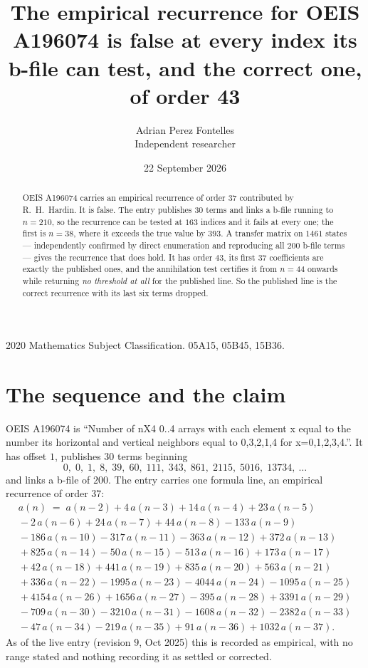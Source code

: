 \documentclass[11pt,a4paper]{article}
\title{The empirical recurrence for OEIS A196074 is false at every index its b-file can
test, and the correct one, of order 43}
\author{Adrian Perez Fontelles\\ \small Independent researcher}
\date{22 September 2026}
\theoremstyle{plain}
\theoremstyle{definition}
\begin{document}
\maketitle

\begin{abstract}
OEIS A196074 carries an empirical recurrence of order $37$ contributed by R.~H.~Hardin. It is
false. The entry publishes $30$ terms and links a b-file running to $n=210$, so the recurrence
can be tested at $163$ indices and it fails at every one; the first is $n=38$, where it exceeds
the true value by $393$. A transfer matrix on $1461$ states --- independently confirmed by
direct enumeration and reproducing all $200$ b-file terms --- gives the recurrence that does
hold. It has order $43$, its first $37$ coefficients are exactly the published ones, and the
annihilation test certifies it from $n=44$ onwards while returning \emph{no threshold at all}
for the published line. So the published line is the correct recurrence with its last six terms
dropped.
\end{abstract}

\noindent\small 2020 Mathematics Subject Classification. 05A15, 05B45, 15B36.\normalsize

\section{The sequence and the claim}

OEIS A196074 is ``Number of nX4 0..4 arrays with each element x equal to the number its
horizontal and vertical neighbors equal to 0,3,2,1,4 for x=0,1,2,3,4.''. It has offset $1$,
publishes $30$ terms beginning
\[
0,\;0,\;1,\;8,\;39,\;60,\;111,\;343,\;861,\;2115,\;5016,\;13734,\ \dots
\]
and links a b-file of $200$. The entry carries one formula line, an empirical recurrence of
order $37$:
\begin{multline}\label{eq:conj}
a(n)\;=\;a(n-2) + 4\,a(n-3) + 14\,a(n-4) + 23\,a(n-5)\\
{}- 2\,a(n-6) + 24\,a(n-7) + 44\,a(n-8) - 133\,a(n-9)\\
{}- 186\,a(n-10) - 317\,a(n-11) - 363\,a(n-12) + 372\,a(n-13)\\
{}+ 825\,a(n-14) - 50\,a(n-15) - 513\,a(n-16) + 173\,a(n-17)\\
{}+ 42\,a(n-18) + 441\,a(n-19) + 835\,a(n-20) + 563\,a(n-21)\\
{}+ 336\,a(n-22) - 1995\,a(n-23) - 4044\,a(n-24) - 1095\,a(n-25)\\
{}+ 4154\,a(n-26) + 1656\,a(n-27) - 395\,a(n-28) + 3391\,a(n-29)\\
{}- 709\,a(n-30) - 3210\,a(n-31) - 1608\,a(n-32) - 2382\,a(n-33)\\
{}- 47\,a(n-34) - 219\,a(n-35) + 91\,a(n-36) + 1032\,a(n-37).
\end{multline}
As of the live entry (revision $9$, Oct 2025) this is recorded as empirical, with no range
stated and nothing recording it as settled or corrected.
\end{document}
